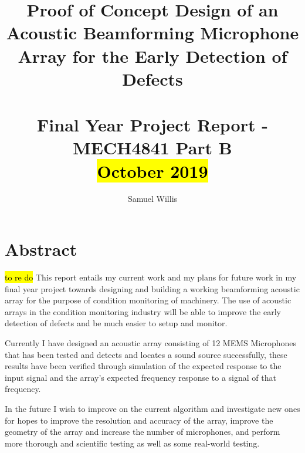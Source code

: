 \documentclass{UoNMCHA}
\numberwithin{equation}{section}
\begin{document}
\singlespacing
\title{Proof of Concept Design of an Acoustic Beamforming Microphone Array for the Early Detection of Defects \\ \ \\
{\small Final Year Project Report - MECH4841 Part B  \\\hl{October 2019}}}
\author[UoNMCHA]{Samuel Willis}
\address[UoNMCHA]{
Student of Mechanical Engineering,\\
The University of Newcastle, Callaghan, NSW 2308, AUSTRALIA \\
Student Number: 3256767 \\
E-mail: \href{mailto:s.willis@uon.edu.au}{\textsf{s.willis@uon.edu.au}}}
\maketitle
\onecolumn
\newpage
\onehalfspacing
\vspace{-5mm}
\section*{Abstract}
\vspace{-3mm}
    \hl{to re do}
    This report entails my current work and my plans for future work in my final year project towards designing and building a working beamforming acoustic array for the purpose of condition monitoring of machinery. The use of acoustic arrays in the condition monitoring industry will be able to improve the early detection of defects and be much easier to setup and monitor.
    
    Currently I have designed an acoustic array consisting of 12 MEMS Microphones that has been tested and detects and locates a sound source successfully, these results have been verified through simulation of the expected response to the input signal and the array's expected frequency response to a signal of that frequency.
    
    In the future I wish to improve on the current algorithm and investigate new ones for hopes to improve the resolution and accuracy of the array, improve the geometry of the array and increase the number of microphones, and perform more thorough and scientific testing as well as some real-world testing.

\singlespacing
\newpage
\tableofcontents
\newpage
\listoftables
\listoffigures
\newpage
\end{document}
